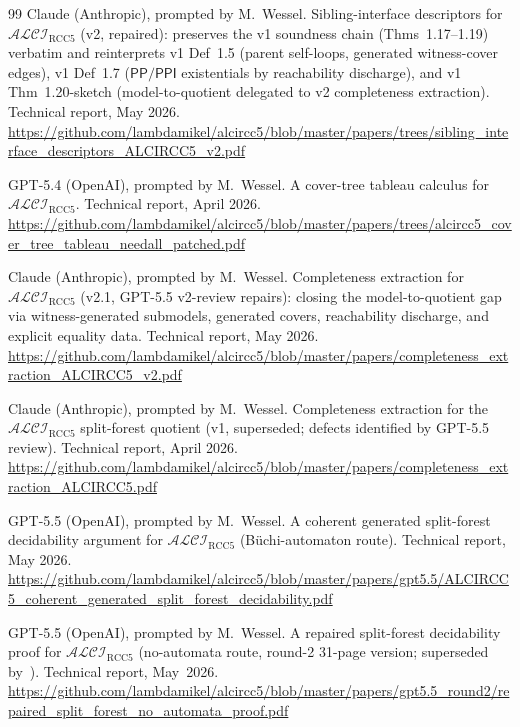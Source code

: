 \documentclass[11pt]{article}
\newcommand{\ALCIRCC}[1]{\mathcal{ALCI}_{\mathrm{RCC#1}}}
\newcommand{\PP}{\mathsf{PP}}
\newcommand{\PPI}{\mathsf{PPI}}
\theoremstyle{plain}
\theoremstyle{definition}
\begin{document}
\begin{thebibliography}{99}
Claude (Anthropic), prompted by M.\ Wessel.
\newblock Sibling-interface descriptors for $\ALCIRCC{5}$ (v2,
  repaired): preserves the v1 soundness chain
  (Thms~1.17--1.19) verbatim and reinterprets v1 Def~1.5
  (parent self-loops, generated witness-cover edges), v1 Def~1.7
  ($\PP/\PPI$ existentials by reachability discharge), and v1
  Thm~1.20-sketch (model-to-quotient delegated to v2 completeness
  extraction).
\newblock Technical report, May 2026.
\newblock \url{https://github.com/lambdamikel/alcircc5/blob/master/papers/trees/sibling_interface_descriptors_ALCIRCC5_v2.pdf}

GPT-5.4 (OpenAI), prompted by M.\ Wessel.
\newblock A cover-tree tableau calculus for $\ALCIRCC{5}$.
\newblock Technical report, April 2026.
\newblock \url{https://github.com/lambdamikel/alcircc5/blob/master/papers/trees/alcircc5_cover_tree_tableau_needall_patched.pdf}

Claude (Anthropic), prompted by M.\ Wessel.
\newblock Completeness extraction for $\ALCIRCC{5}$ (v2.1,
  GPT-5.5 v2-review repairs): closing the model-to-quotient gap via
  witness-generated submodels, generated covers, reachability
  discharge, and explicit equality data.
\newblock Technical report, May 2026.
\newblock \url{https://github.com/lambdamikel/alcircc5/blob/master/papers/completeness_extraction_ALCIRCC5_v2.pdf}

Claude (Anthropic), prompted by M.\ Wessel.
\newblock Completeness extraction for the $\ALCIRCC{5}$ split-forest
  quotient (v1, superseded; defects identified by GPT-5.5 review).
\newblock Technical report, April 2026.
\newblock \url{https://github.com/lambdamikel/alcircc5/blob/master/papers/completeness_extraction_ALCIRCC5.pdf}

GPT-5.5 (OpenAI), prompted by M.\ Wessel.
\newblock A coherent generated split-forest decidability argument
  for $\ALCIRCC{5}$ (B\"uchi-automaton route).
\newblock Technical report, May 2026.
\newblock \url{https://github.com/lambdamikel/alcircc5/blob/master/papers/gpt5.5/ALCIRCC5_coherent_generated_split_forest_decidability.pdf}

GPT-5.5 (OpenAI), prompted by M.\ Wessel.
\newblock A repaired split-forest decidability proof for
  $\ALCIRCC{5}$ (no-automata route, round-2 31-page version;
  superseded by~\cite{GPT55Round7Sketch}).
\newblock Technical report, May~2026.
\newblock \url{https://github.com/lambdamikel/alcircc5/blob/master/papers/gpt5.5_round2/repaired_split_forest_no_automata_proof.pdf}


\end{thebibliography}
\end{document}
